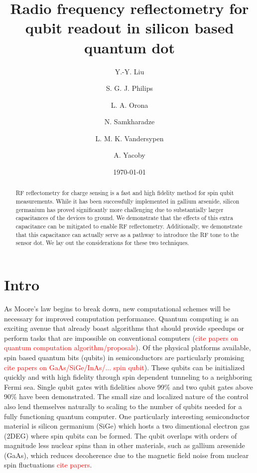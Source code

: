 \documentclass{article}
\begin{document}
	
\title{Radio frequency reflectometry for qubit readout in silicon based quantum dot}

\author{Y.-Y. Liu}
\author{S. G. J. Philips}
\author{L. A. Orona}
\author{N. Samkharadze}
\author{L. M. K. Vandersypen}
\author{A. Yacoby}

\date{\today}


\begin{abstract}
RF reflectometry for charge sensing is a fast and high fidelity method for spin qubit measurements.  While it has been successfully implemented in gallium arsenide, silicon germanium has proved significantly more challenging due to substantially larger capacitances of the devices to ground.  We demonstrate that the effects of this extra capacitance can be mitigated to enable RF reflectometry.  Additionally, we demonstrate that this capacitance can actually serve as a pathway to introduce the RF tone to the sensor dot.  We lay out the considerations for these two techniques.
\end{abstract}

\maketitle

\section{Intro} %
	\label{sec:intro}
	As Moore’s law begins to break down, new computational schemes will be necessary for improved computation performance.  Quantum computing is an exciting avenue that already boast algorithms that should provide speedups or perform tasks that are impossible on conventional computers (\textcolor{red}{cite papers on quantum computation algorithm/proposals}).  Of the physical platforms available, spin based quantum bits (qubits) in semiconductors are particularly promising \cite{Morton11} \textcolor{red}{cite papers on GaAs/SiGe/InAs/... spin qubit}).  These qubits can be initialized quickly and with high fidelity through spin dependent tunneling to a neighboring Fermi sea.  Single qubit gates with fidelities above 99\% and two qubit gates above 90\% have been demonstrated.  The small size and localized nature of the control also lend themselves naturally to scaling to the number of qubits needed for a fully functioning quantum computer. One particularly interesting semiconductor material is silicon germanium (SiGe) which hosts a two dimentional electron gas (2DEG) where spin qubits can be formed. The qubit overlaps with orders of magnitude less nuclear spins than in other materials, such as gallium aresenide (GaAs), which reduces decoherence due to the magnetic field noise from nuclear spin fluctuations \textcolor{red}{cite papers}. 
\end{document}
